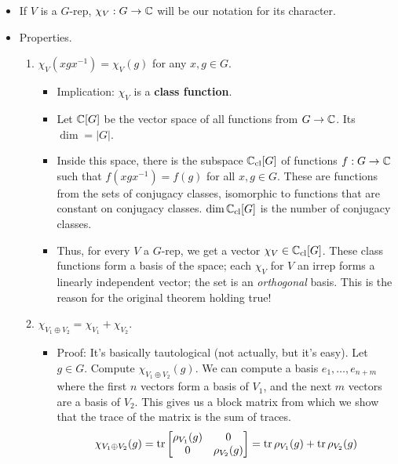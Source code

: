 \documentclass[../notes.tex]{subfiles}
\begin{document}
\begin{itemize}
\begin{itemize}
\begin{itemize}
        \end{itemize}
    \end{itemize}
    \item If $V$ is a $G$-rep, $\chi_V:G\to\mathbb{C}$ will be our notation for its character.
    \item Properties.
    \begin{enumerate}
        \item $\chi_V(xgx^{-1})=\chi_V(g)$ for any $x,g\in G$.
        \begin{itemize}
            \item Implication: $\chi_V$ is a \textbf{class function}.
            \item Let $\mathbb{C}[G]$ be the vector space of all functions from $G\to\mathbb{C}$. Its $\dim=|G|$.
            \item Inside this space, there is the subspace $\mathbb{C}_\text{cl}[G]$ of functions $f:G\to\mathbb{C}$ such that $f(xgx^{-1})=f(g)$ for all $x,g\in G$. These are functions from the sets of conjugacy classes, isomorphic to functions that are constant on conjugacy classes. $\dim\mathbb{C}_\text{cl}[G]$ is the number of conjugacy classes.
            \item Thus, for every $V$ a $G$-rep, we get a vector $\chi_V\in\mathbb{C}_\text{cl}[G]$. These class functions form a basis of the space; each $\chi_V$ for $V$ an irrep forms a linearly independent vector; the set is an \emph{orthogonal} basis. This is the reason for the original theorem holding true!
        \end{itemize}
        \item $\chi_{V_1\oplus V_2}=\chi_{V_1}+\chi_{V_2}$.
        \begin{itemize}
            \item Proof: It's basically tautological (not actually, but it's easy). Let $g\in G$. Compute $\chi_{V_1\oplus V_2}(g)$. We can compute a basis $e_1,\dots,e_{n+m}$ where the first $n$ vectors form a basis of $V_1$, and the next $m$ vectors are a basis of $V_2$. This gives us a block matrix from which we show that the trace of the matrix is the sum of traces.
            \begin{equation*}
                \chi_{V_1\oplus V_2}(g) = \tr
                \begin{bmatrix}
                    \rho_{V_1}(g) & 0\\
                    0 & \rho_{V_2}(g)\\
                \end{bmatrix}
                = \tr\rho_{V_1}(g)+\tr\rho_{V_2}(g)

\end{equation*}
\end{itemize}
\end{enumerate}
\end{itemize}
\end{document}
